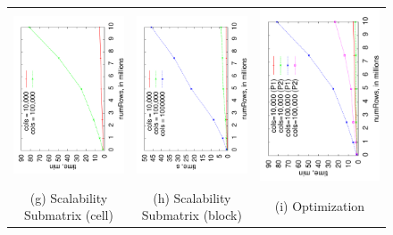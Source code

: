 \documentclass{vldb}
\begin{document}
{\begin{figure}
\begin{tabular}{ccc}
\includegraphics[angle=-90,width=2.3in]{submatrix-cell.pdf} &
\hspace*{-0.2in}
\includegraphics[angle=-90,width=2.3in]{all-block.pdf} &
\hspace*{-0.2in}
\includegraphics[angle=-90,width=2.3in]{optimization.pdf} \\
(g) Scalability Submatrix (cell) & (h) Scalability Submatrix (block) & (i) Optimization \\



\end{tabular}
\end{figure}}
\end{document}
